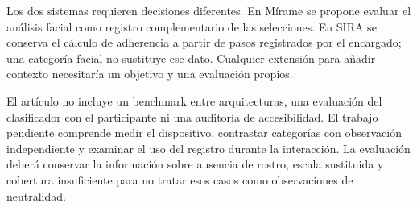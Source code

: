 \documentclass[conference,letterpaper]{IEEEtran}
\begin{document}
Los dos sistemas requieren decisiones diferentes. En Mírame se propone evaluar el análisis facial como registro complementario de las selecciones. En SIRA se conserva el cálculo de adherencia a partir de pasos registrados por el encargado; una categoría facial no sustituye ese dato. Cualquier extensión para añadir contexto necesitaría un objetivo y una evaluación propios.

El artículo no incluye un benchmark entre arquitecturas, una evaluación del clasificador con el participante ni una auditoría de accesibilidad. El trabajo pendiente comprende medir el dispositivo, contrastar categorías con observación independiente y examinar el uso del registro durante la interacción. La evaluación deberá conservar la información sobre ausencia de rostro, escala sustituida y cobertura insuficiente para no tratar esos casos como observaciones de neutralidad.
\end{document}
